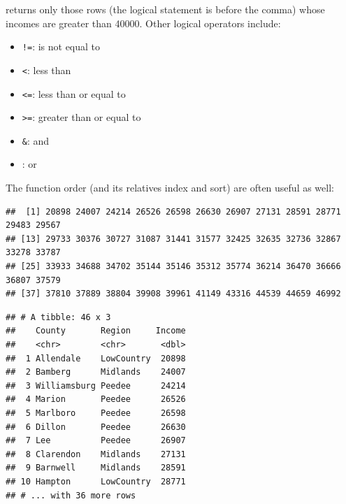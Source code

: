 \documentclass[
]{book}
\newenvironment{Shaded}{\begin{snugshade}}{\end{snugshade}}
\newcommand{\DecValTok}[1]{\textcolor[rgb]{0.00,0.00,0.81}{#1}}
\newcommand{\FunctionTok}[1]{\textcolor[rgb]{0.00,0.00,0.00}{#1}}
\newcommand{\NormalTok}[1]{#1}
\newcommand{\SpecialCharTok}[1]{\textcolor[rgb]{0.00,0.00,0.00}{#1}}
\providecommand{\tightlist}{%
  \setlength{\itemsep}{0pt}\setlength{\parskip}{0pt}}
\begin{document}
returns only those rows (the logical statement is before the comma) whose incomes are greater than 40000. Other logical operators include:

\begin{itemize}
\tightlist
\item
  \texttt{!=}: is not equal to
\item
  \texttt{\textless{}}: less than
\item
  \texttt{\textless{}=}: less than or equal to
\item
  \texttt{\textgreater{}=}: greater than or equal to
\item
  \texttt{\&}: and
\item
  \texttt{\textbar{}}: or
\end{itemize}

The function order (and its relatives index and sort) are often useful as well:

\begin{Shaded}
\end{Shaded}

\begin{verbatim}
##  [1] 20898 24007 24214 26526 26598 26630 26907 27131 28591 28771 29483 29567
## [13] 29733 30376 30727 31087 31441 31577 32425 32635 32736 32867 33278 33787
## [25] 33933 34688 34702 35144 35146 35312 35774 36214 36470 36666 36807 37579
## [37] 37810 37889 38804 39908 39961 41149 43316 44539 44659 46992
\end{verbatim}

\begin{Shaded}
\end{Shaded}

\begin{verbatim}
## # A tibble: 46 x 3
##    County       Region     Income
##    <chr>        <chr>       <dbl>
##  1 Allendale    LowCountry  20898
##  2 Bamberg      Midlands    24007
##  3 Williamsburg Peedee      24214
##  4 Marion       Peedee      26526
##  5 Marlboro     Peedee      26598
##  6 Dillon       Peedee      26630
##  7 Lee          Peedee      26907
##  8 Clarendon    Midlands    27131
##  9 Barnwell     Midlands    28591
## 10 Hampton      LowCountry  28771
## # ... with 36 more rows
\end{verbatim}
\end{document}

